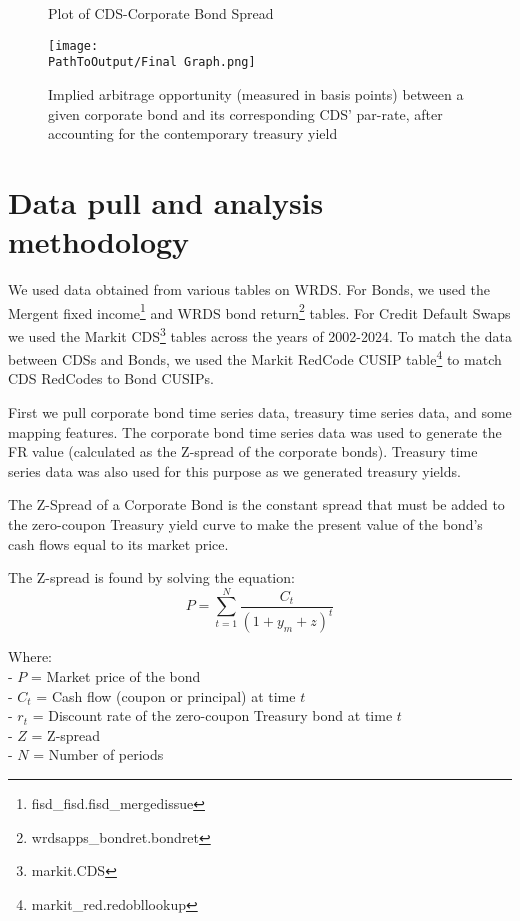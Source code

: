 \documentclass[12pt]{article}
\begin{document}
\begin{figure}
    \centering
    \caption{Plot of CDS-Corporate Bond Spread}
      \centering
      \texttt{[image: \\PathToOutput/Final Graph.png]}
    
    \caption*{
      Implied arbitrage opportunity (measured in basis points) between a given 
      corporate bond and its corresponding CDS' par-rate, after accounting for the 
      contemporary treasury yield
      }
    \label{fig:div-futures-habits-comparison}
    \end{figure}

\section{Data pull and analysis methodology}

We used data obtained from various tables on WRDS.
For Bonds, we used the Mergent fixed income\footnote{fisd\_fisd.fisd\_mergedissue} and 
WRDS bond return\footnote{wrdsapps\_bondret.bondret} tables.
For Credit Default Swaps we used the Markit CDS\footnote{markit.CDS}
tables across the years of 2002-2024. To match the data between CDSs and Bonds, we
used the Markit RedCode CUSIP table\footnote{markit\_red.redobllookup} to match 
CDS RedCodes to Bond CUSIPs.

First we pull corporate bond time series data, treasury time series data, 
and some mapping features. The corporate bond time series data was used to 
generate the FR value (calculated as the Z-spread of the corporate bonds). 
Treasury time series data was also used for this purpose as we generated treasury yields.

The Z-Spread of a Corporate Bond is the constant spread that must be added to 
the zero-coupon Treasury yield curve to make the present value of the bond's 
cash flows equal to its market price. 

The Z-spread is found by solving the equation:
\begin{equation}
    P = \sum_{t=1}^{N} \frac{C_t}{(1 + y_m + z)^t}
\end{equation}


Where: \\
- $P$ = Market price of the bond \\
- $C_t$ = Cash flow (coupon or principal) at time $t$ \\
- $r_t$ = Discount rate of the zero-coupon Treasury bond at time $t$ \\
- $Z$ = Z-spread \\
- $N$ = Number of periods \\
\end{document}
